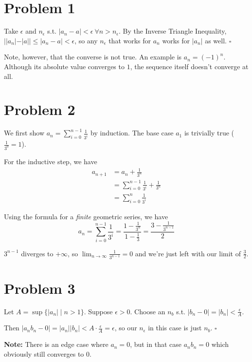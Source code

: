 \documentclass[12pt]{article}
\begin{document}
\section{Problem 1}

Take $\epsilon$ and $n_\epsilon$ s.t. $|a_n-a|<\epsilon\ \forall n > n_\epsilon$.
By the Inverse Triangle Inequality, $||a_n|-|a|| \le |a_n-a|<\epsilon$,
so any $n_\epsilon$ that works for $a_n$ works for $|a_n|$ as well. $\square$

Note, however, that the converse is not true.
An example is $a_n=(-1)^n$.
Although its absolute value converges to $1$, the sequence itself
doesn't converge at all.

\section{Problem 2}

We first show $a_n=\sum_{i=0}^{n-1} \frac{1}{3^i}$ by induction.
The base case $a_1$ is trivially true ($\frac{1}{3^0}=1$).

For the inductive step, we have
\begin{align*}
  a_{n+1}
   & = a_n + \frac{1}{3^n}                            \\
   & = \sum_{i=0}^{n-1} \frac{1}{3^i} + \frac{1}{3^n} \\
   & = \sum_{i=0}^{n} \frac{1}{3^i}
\end{align*}

Using the formula for a \textit{finite} geometric series, we have
\[a_n = \sum_{i=0}^{n-1} \frac{1}{3^i} = \frac{1-\frac{1}{3^n}}{1-\frac{1}{3}}=\frac{3-\frac{1}{3^{n-1}}}{2}\]

$3^{n-1}$ diverges to $+\infty$, so $\lim_{n \to \infty} \frac{1}{3^{n-1}}=0$
and we're just left with our limit of $\boxed{\frac{3}{2}}$.

\pagebreak

\section{Problem 3}

Let $A=\sup \{|a_n| \mid n > 1\}$.
Suppose $\epsilon > 0$.
Choose an $n_b$ s.t. $|b_n-0|=|b_n| < \frac{\epsilon}{A}$.

Then $|a_nb_n-0|=|a_n||b_n| < A \cdot \frac{\epsilon}{A} = \epsilon$,
so our $n_\epsilon$ in this case is just $n_b$. $\square$

\textbf{Note:} There is an edge case where $a_n=0$, but in that case $a_nb_n=0$ which obviously still converges to $0$.
\end{document}
